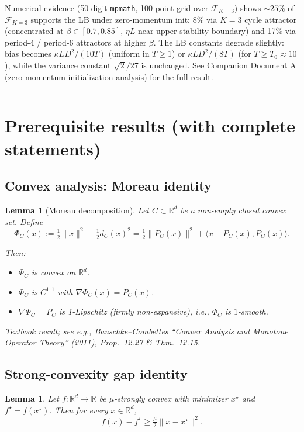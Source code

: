 \documentclass[11pt,a4paper]{article}
\theoremstyle{plain}
\newtheorem{lemma}[theorem]{Lemma}
\theoremstyle{definition}
\theoremstyle{remark}
\newcommand{\R}{\mathbb{R}}
\newcommand{\F}{\mathcal{F}}
\begin{document}
Numerical evidence (50-digit \texttt{mpmath}, 100-point grid over $\F_{K=3}$) shows ${\sim}25\%$ of $\F_{K=3}$ supports the LB under zero-momentum init: 8\% via $K=3$ cycle attractor (concentrated at $\beta \in [0.7, 0.85]$, $\eta L$ near upper stability boundary) and 17\% via period-4 / period-6 attractors at higher $\beta$. The LB constants degrade slightly: bias becomes $\kappa LD^2/(10T)$ (uniform in $T \ge 1$) or $\kappa LD^2/(8T)$ (for $T \ge T_0 \approx 10$), while the variance constant $\sqrt 2/27$ is unchanged. See Companion Document A (zero-momentum initialization analysis) for the full result.

\bigskip
\hrule
\bigskip

\section{Prerequisite results (with complete statements)}

\subsection{Convex analysis: Moreau identity}

\begin{lemma}[Moreau decomposition]
\label{lem:1.1}
Let $C \subset \R^d$ be a non-empty closed convex set. Define
\[
\Phi_C(x) := \tfrac{1}{2}\|x\|^2 - \tfrac{1}{2} d_C(x)^2 = \tfrac{1}{2}\|P_C(x)\|^2 + \langle x - P_C(x), P_C(x)\rangle.
\]

Then:
\begin{itemize}
\item $\Phi_C$ is convex on $\R^d$.
\item $\Phi_C$ is $C^{1,1}$ with $\nabla \Phi_C(x) = P_C(x)$.
\item $\nabla \Phi_C = P_C$ is 1-Lipschitz (firmly non-expansive), i.e., $\Phi_C$ is $1$-smooth.
\end{itemize}
\end{lemma}

\emph{Textbook result; see e.g., Bauschke--Combettes ``Convex Analysis and Monotone Operator Theory'' (2011), Prop.\ 12.27 \& Thm.\ 12.15.}

\subsection{Strong-convexity gap identity}

\begin{lemma}
\label{lem:1.2}
Let $f : \R^d \to \R$ be $\mu$-strongly convex with minimizer $x^\star$ and $f^\star = f(x^\star)$. Then for every $x \in \R^d$,
\[
f(x) - f^\star \geq \tfrac{\mu}{2}\|x - x^\star\|^2.
\]
\end{lemma}
\end{document}

